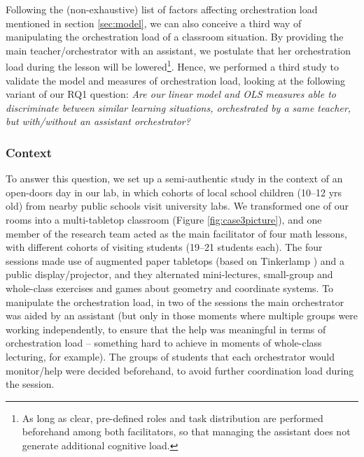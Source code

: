 \documentclass[10pt,journal,compsoc]{IEEEtran}
\begin{document}
Following the (non-exhaustive) list of factors affecting orchestration load mentioned in section \ref{sec:model}, we can also conceive a third way of manipulating the orchestration load of a classroom situation. By providing the main teacher/orchestrator with an assistant, we postulate that her orchestration load during the lesson will be lowered\footnote{As long as clear, pre-defined roles and task distribution are performed beforehand among both facilitators, so that managing the assistant does not generate additional cognitive load.}. Hence, we performed a third study to validate the model and measures of orchestration load, looking at the following variant of our RQ1 question: \textit{Are our linear model and OLS measures able to discriminate between similar learning situations, orchestrated by a same teacher, but with/without an assistant orchestrator?}


\subsubsection{Context}

To answer this question, we set up a semi-authentic study in the context of an open-doors day in our lab, in which cohorts of local school children (10--12 yrs old) from nearby public schools visit university labs. We transformed one of our rooms into a multi-tabletop classroom (Figure \ref{fig:case3picture}), and one member of the research team acted as the main facilitator of four math lessons, with different cohorts of visiting students (19--21 students each). The four sessions made use of augmented paper tabletops (based on Tinkerlamp \cite{do2012tinkerlamp}) and a public display/projector, and they alternated mini-lectures, small-group and whole-class exercises and games about geometry and coordinate systems. To manipulate the orchestration load, in two of the sessions the main orchestrator was aided by an assistant (but only in those moments where multiple groups were working independently, to ensure that the help was meaningful in terms of orchestration load -- something hard to achieve in moments of whole-class lecturing, for example). The groups of students that each orchestrator would monitor/help were decided beforehand, to avoid further coordination load during the session.
\end{document}
